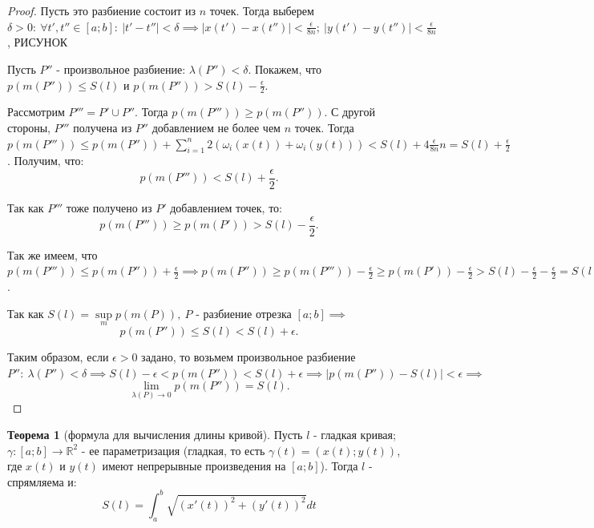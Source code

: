 \documentclass{report}
\theoremstyle{definition}
\newtheorem{theorem}{Теорема}[section]
\begin{document}
\begin{proof}
  Пусть это разбиение состоит из $n$ точек. Тогда выберем $\delta > 0: \ \forall t',t'' \in [a;b]: \
    |t'-t''| < \delta \implies | x(t') - x(t'') | < \frac{\epsilon}{8n}; \ | y(t') - y(t'') | < \frac{\epsilon}
    {8n}$, {\Large РИСУНОК}

  Пусть $P''$ - произвольное разбиение: $\lambda(P'') < \delta$. Покажем, что $p(m(P'')) \leqslant S(l)$
  и $p(m(P'')) > S(l) - \frac{\epsilon}{2}$.

  Рассмотрим $P''' = P' \cup P''$. Тогда $p(m(P''')) \geqslant p(m(P''))$. С другой стороны, $P'''$ 
  получена из $P''$ добавлением не более чем $n$ точек. Тогда $p(m(P''')) \leqslant p(m(P'')) +
  \sum_{i=1}^{n}2(\omega_i(x(t)) + \omega_i(y(t))) < S(l) + 4 \frac{\epsilon}{8n}n = S(l) +
  \frac{\epsilon}{2}$. Получим, что:
  \begin{equation*}
    p(m(P''')) < S(l) + \frac{\epsilon}{2}.
  \end{equation*}

  Так как $P'''$ тоже получено из $P'$ добавлением точек, то:
  \begin{equation*}
    p(m(P''')) \geqslant p(m(P')) > S(l) - \frac{\epsilon}{2}.
  \end{equation*}

  Так же имеем, что $p(m(P''')) \leqslant p(m(P'')) + \frac{\epsilon}{2} \implies p(m(P'')) \geqslant
  p(m(P''')) - \frac{\epsilon}{2} \geqslant p(m(P')) - \frac{\epsilon}{2} > S(l) - \frac{\epsilon}{2}
  - \frac{\epsilon}{2} = S(l) - \epsilon$.

  Так как $S(l) = \underset{m}{\sup} p(m(P)), \ P$ - разбиение отрезка $[a;b] \implies$
  \begin{equation*}
    p(m(P'')) \leqslant S(l) < S(l) + \epsilon.
  \end{equation*}

  Таким образом, если $\epsilon > 0$ задано, то возьмем произвольное разбиение $P'': \ \lambda(P'') <
  \delta \implies S(l) - \epsilon < p(m(P'')) < S(l) + \epsilon \implies | p(m(P'')) - S(l) | < \epsilon
  \implies$
  \begin{equation*}
    \underset{\lambda(P)\rightarrow0}{\lim}p(m(P'')) = S(l).
  \end{equation*}
\end{proof}

\begin{theorem}[формула для вычисления длины кривой]
  Пусть $l$ - гладкая кривая; $\gamma:[a;b]\rightarrow\mathbb{R}^2$ - ее параметризация (гладкая,
  то есть $\gamma(t) = (x(t);y(t))$, где $x(t)$ и $y(t)$ имеют непрерывные произведения на $[a;b]$).
  Тогда $l$ - спрямляема и:
  \begin{equation*}
    S(l) = \int_{a}^{b}\sqrt{(x'(t))^2 + (y'(t))^2}dt
  \end{equation*}
\end{theorem}
\end{document}
